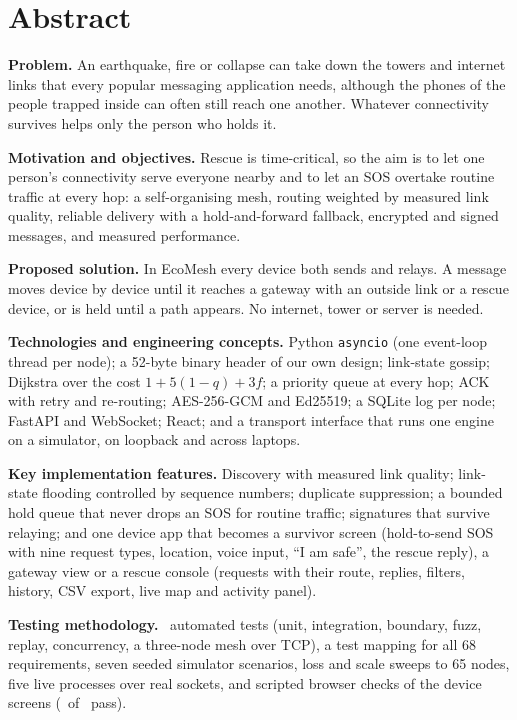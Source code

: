 





\section*{Abstract}

\textbf{Problem.} An earthquake, fire or collapse can take down the towers and internet links that every popular messaging application needs, although the phones of the people trapped inside can often still reach one another. Whatever connectivity survives helps only the person who holds it.

\textbf{Motivation and objectives.} Rescue is time-critical, so the aim is to let one person's connectivity serve everyone nearby and to let an SOS overtake routine traffic at every hop: a self-organising mesh, routing weighted by measured link quality, reliable delivery with a hold-and-forward fallback, encrypted and signed messages, and measured performance.

\textbf{Proposed solution.} In EcoMesh every device both sends and relays. A message moves device by device until it reaches a gateway with an outside link or a rescue device, or is held until a path appears. No internet, tower or server is needed.

\textbf{Technologies and engineering concepts.} Python \texttt{asyncio} (one event-loop thread per node); a 52-byte binary header of our own design; link-state gossip; Dijkstra over the cost $1+5(1-q)+3f$; a priority queue at every hop; ACK with retry and re-routing; AES-256-GCM and Ed25519; a SQLite log per node; FastAPI and WebSocket; React; and a transport interface that runs one engine on a simulator, on loopback and across laptops.

\textbf{Key implementation features.} Discovery with measured link quality; link-state flooding controlled by sequence numbers; duplicate suppression; a bounded hold queue that never drops an SOS for routine traffic; signatures that survive relaying; and one device app that becomes a survivor screen (hold-to-send SOS with nine request types, location, voice input, ``I am safe'', the rescue reply), a gateway view or a rescue console (requests with their route, replies, filters, history, CSV export, live map and activity panel).

\textbf{Testing methodology.} \NTests\ automated tests (unit, integration, boundary, fuzz, replay, concurrency, a three-node mesh over TCP), a test mapping for all 68 requirements, seven seeded simulator scenarios, loss and scale sweeps to 65 nodes, five live processes over real sockets, and scripted browser checks of the device screens (\NDevPass\ of \NDevChecks\ pass).

